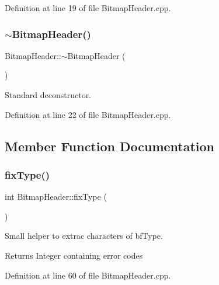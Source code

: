 Definition at line 19 of file Bitmap\+Header.\+cpp.

\mbox{\label{classBitmapHeader_a4e102d5fe9a8619fca7319b148ec23d1}} 
\subsubsection{\texorpdfstring{$\sim$BitmapHeader()}{~BitmapHeader()}}
{\footnotesize\ttfamily Bitmap\+Header\+::$\sim$\+Bitmap\+Header (\begin{DoxyParamCaption}{ }\end{DoxyParamCaption})\hspace{0.3cm}{\ttfamily [virtual]}}

Standard deconstructor. 

Definition at line 22 of file Bitmap\+Header.\+cpp.



\subsection{Member Function Documentation}
\mbox{\label{classBitmapHeader_aa02e59db95074c6a96a44dac03cee77b}} 
\subsubsection{\texorpdfstring{fixType()}{fixType()}}
{\footnotesize\ttfamily int Bitmap\+Header\+::fix\+Type (\begin{DoxyParamCaption}{ }\end{DoxyParamCaption})\hspace{0.3cm}{\ttfamily [private]}}



Small helper to extrac characters of bf\+Type. 

\begin{DoxyReturn}{Returns}
Integer containing error codes 
\end{DoxyReturn}


Definition at line 60 of file Bitmap\+Header.\+cpp.

